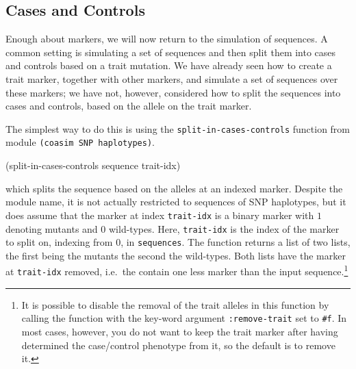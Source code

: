 \documentclass{manual}
\begin{document}
\subsection{Cases and Controls}
\label{sec:cases-controls}

Enough about markers, we will now return to the simulation of
sequences.  A common setting is simulating a set of sequences and then
split them into cases and controls based on a trait mutation.  We have
already seen how to create a trait marker, together with other
markers, and simulate a set of sequences over these markers; we have
not, however, considered how to split the sequences into cases and
controls, based on the allele on the trait marker.

The simplest way to do this is using the
\texttt{split-in-cases-controls} function from module \texttt{(coasim
  SNP haplotypes)}.
\begin{code}
(split-in-cases-controls sequence trait-idx)
\end{code}
which splits the sequence based on the alleles at an indexed marker.
Despite the module name, it is not actually restricted to sequences of
SNP haplotypes, but it does assume that the marker at index
\texttt{trait-idx} is a binary marker with $1$ denoting mutants and
$0$ wild-types.  Here, \texttt{trait-idx} is the index of the marker
to split on, indexing from $0$, in \texttt{sequences}.  The function
returns a list of two lists, the first being the mutants the second
the wild-types.  Both lists have the marker at \texttt{trait-idx}
removed, i.e.\ the contain one less marker than the input
sequence.\footnote{
  It is possible to disable the removal of the trait alleles in this
  function by calling the function with the key-word argument
  \texttt{:remove-trait} set to \texttt{\#f}.  In most cases, however,
  you do not want to keep the trait marker after having determined the
  case/control phenotype from it, so the default is to remove it.
  }
\end{document}
